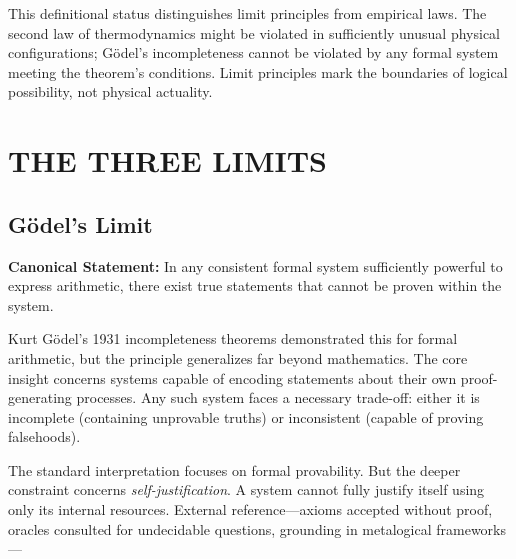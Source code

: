\documentclass[12pt]{article}
\begin{document}
This definitional status distinguishes limit principles from empirical laws. The second law of thermodynamics might be violated in sufficiently unusual physical configurations; Gödel's incompleteness cannot be violated by any formal system meeting the theorem's conditions. Limit principles mark the boundaries of logical possibility, not physical actuality.

\section{THE THREE LIMITS}

\subsection{Gödel's Limit}

\textbf{Canonical Statement:} In any consistent formal system sufficiently powerful to express arithmetic, there exist true statements that cannot be proven within the system.

Kurt Gödel's 1931 incompleteness theorems demonstrated this for formal arithmetic, but the principle generalizes far beyond mathematics. The core insight concerns systems capable of encoding statements about their own proof-generating processes. Any such system faces a necessary trade-off: either it is incomplete (containing unprovable truths) or inconsistent (capable of proving falsehoods).

The standard interpretation focuses on formal provability. But the deeper constraint concerns \textit{self-justification}. A system cannot fully justify itself using only its internal resources. External reference—axioms accepted without proof, oracles consulted for undecidable questions, grounding in metalogical frameworks—
\end{document}
